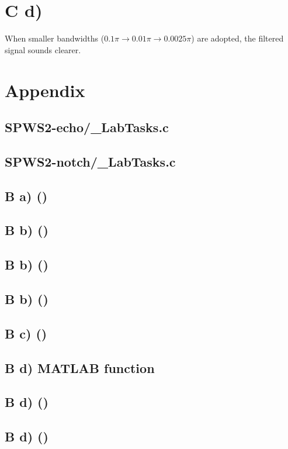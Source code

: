 \documentclass{article}
\newenvironment{homeworkProblem}[1]{
	\section*{#1}
	}{
}
\newenvironment{homeworkSection}[1]{
	\subsection*{#1}
	}{
}
\begin{document}
\begin{homeworkProblem}{C d)}


When smaller bandwidths ($0.1\pi \to 0.01\pi \to 0.0025\pi$) are adopted, the filtered signal sounds clearer.


\end{homeworkProblem}


\newpage
\begin{homeworkProblem}{Appendix}

\begin{homeworkSection}{SPWS2-echo/\_LabTasks.c}
	
\end{homeworkSection}

\newpage
\begin{homeworkSection}{SPWS2-notch/\_LabTasks.c}
	
\end{homeworkSection}

\newpage
\begin{homeworkSection}{B a) ()}
	
\end{homeworkSection}

\begin{homeworkSection}{B b) (\romannumeral2)}
	
\end{homeworkSection}

\begin{homeworkSection}{B b) ()}
	
\end{homeworkSection}

\begin{homeworkSection}{B b) ()}
	
\end{homeworkSection}

\begin{homeworkSection}{B c) ()}
	
\end{homeworkSection}

\begin{homeworkSection}{B d) MATLAB function}
	
\end{homeworkSection}

\begin{homeworkSection}{B d) ()}
	
\end{homeworkSection}

\begin{homeworkSection}{B d) ()}
	
\end{homeworkSection}

\end{homeworkProblem}

\end{document}
